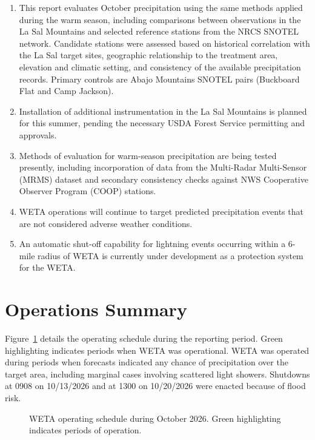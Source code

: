 \documentclass[11pt]{article}
\begin{document}
\begin{enumerate}
  \item This report evaluates October precipitation using the same methods applied during the
  warm season, including comparisons between observations in the La Sal Mountains
  and selected reference stations from the NRCS SNOTEL network. Candidate stations were
  assessed based on historical correlation with the La Sal target sites, geographic relationship
  to the treatment area, elevation and climatic setting, and consistency of the available
  precipitation records. Primary controls are Abajo Mountains SNOTEL pairs
  (Buckboard Flat and Camp Jackson).
  \item Installation of additional instrumentation in the La Sal Mountains is planned for this summer,
  pending the necessary USDA Forest Service permitting and approvals.
  \item Methods of evaluation for warm-season precipitation are being tested presently, including
  incorporation of data from the Multi-Radar Multi-Sensor (MRMS) dataset and secondary
  consistency checks against NWS Cooperative Observer Program (COOP) stations.
  \item WETA operations will continue to target predicted precipitation events that are not considered
  adverse weather conditions.
  \item An automatic shut-off capability for lightning events occurring within a 6-mile radius of WETA
  is currently under development as a protection system for the WETA.
\end{enumerate}

\clearpage

\section{Operations Summary}

Figure~\ref{fig:operations_schedule} details the operating schedule during the reporting period.
Green highlighting indicates periods when WETA was operational. WETA was operated during
periods when forecasts indicated any chance of precipitation over the target area, including
marginal cases involving scattered light showers. Shutdowns at 0908 on 10/13/2026 and at
1300 on 10/20/2026 were enacted because of flood risk.

\begin{figure}[h!]
  \centering
  
  \caption{WETA operating schedule during October 2026. Green highlighting indicates periods of operation.}
  \label{fig:operations_schedule}
\end{figure}
\end{document}
